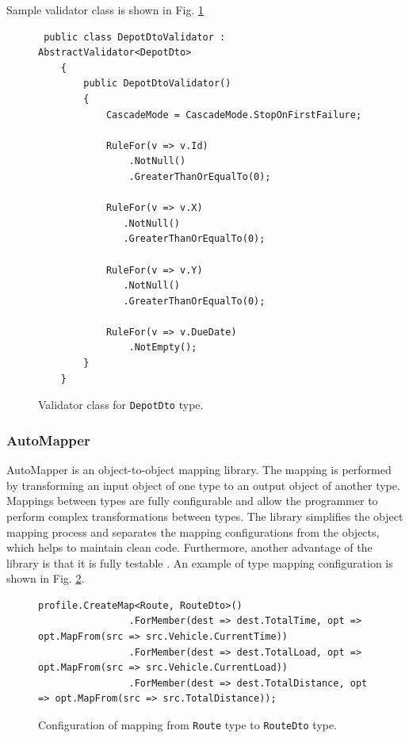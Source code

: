 \documentclass[a4paper,twoside,12pt]{book}
\begin{document}
Sample validator class is shown in Fig. \ref{fig:validator}

\begin{figure}
\centering
\begin{lstlisting}
 public class DepotDtoValidator : AbstractValidator<DepotDto>
    {
        public DepotDtoValidator()
        {
            CascadeMode = CascadeMode.StopOnFirstFailure;

            RuleFor(v => v.Id)
                .NotNull()
                .GreaterThanOrEqualTo(0);

            RuleFor(v => v.X)
               .NotNull()
               .GreaterThanOrEqualTo(0);

            RuleFor(v => v.Y)
               .NotNull()
               .GreaterThanOrEqualTo(0);

            RuleFor(v => v.DueDate)
                .NotEmpty();
        }
    }
\end{lstlisting}
\caption{Validator class for \lstinline|DepotDto| type.}
\label{fig:validator}
\end{figure}

\subsubsection{AutoMapper}
AutoMapper is an object-to-object mapping library. The mapping is performed by transforming an input object of one type to an output object of another type. Mappings between types are fully configurable and allow the programmer to perform complex transformations between types. 
The library simplifies the object mapping process and separates the mapping configurations from the objects, which helps to maintain clean code. Furthermore, another advantage of the library is that it is fully testable \cite{bib:AutoMapper}.
An example of type mapping configuration is shown in Fig. \ref{fig:autoMapper}.

\begin{figure}
\centering
\begin{lstlisting}
profile.CreateMap<Route, RouteDto>()
                .ForMember(dest => dest.TotalTime, opt => opt.MapFrom(src => src.Vehicle.CurrentTime))
                .ForMember(dest => dest.TotalLoad, opt => opt.MapFrom(src => src.Vehicle.CurrentLoad))
                .ForMember(dest => dest.TotalDistance, opt => opt.MapFrom(src => src.TotalDistance));
\end{lstlisting}
\caption{Configuration of mapping from \lstinline|Route| type to \lstinline|RouteDto| type.}
\label{fig:autoMapper}
\end{figure}
\end{document}
